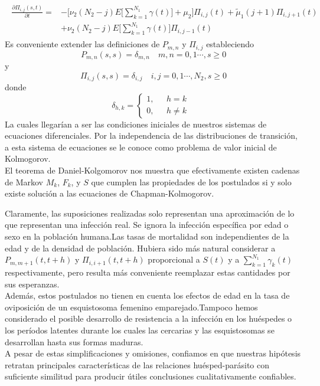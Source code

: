 \begin{eqnarray}
    \begin{array}{cr}
     \frac{\partial\Pi_{i,j}(s,t)}{\partial t}= & -\bigg[\nu_2(N_2-j)E\big[\sum_{k=1}^{N_1}\gamma(t)\big]+\mu_2\bigg]\Pi_{i,j}(t)
     +\tilde{\mu}_1 (j+1)\Pi_{i,j+1}(t)
     \\&+\nu_2(N_2-j)E\big[\sum_{k=1}^{N_1}\gamma(t)\big]\Pi_{i,j-1}(t)
    \end{array}
\end{eqnarray}Es conveniente extender las definiciones de $P_{m,n}$ y $\Pi_{i,j}$ estableciendo $$P_{m,n}(s,s)=\delta_{m,n}\quad m,n=0,1\cdots, s\geq 0$$
y
$$\Pi_{i,j}(s,s)=\delta_{i,j}\quad i,j=0,1\cdots,N_2, s\geq 0$$
donde 
$$\delta_{h,k}=
    \begin{cases}
    1, & \mbox{ $h=k$ } \\
    0, & \mbox{ $h\not=k$}
    \end{cases}$$
La cuales llegarían a ser las condiciones iniciales de nuestros sistemas de ecuaciones diferenciales.
Por la independencia de las distribuciones de transición, a esta sistema de ecuaciones se le conoce como problema de valor inicial de Kolmogorov.\\ El teorema de Daniel-Kolgomorov nos muestra que efectivamente existen cadenas de Markov $M_k$, $F_k$, y $S$ que cumplen las propiedades de los postulados si y solo existe solución a las ecuaciones de Chapman-Kolmogorov.
\begin{Obs}
    Claramente, las suposiciones realizadas solo representan una aproximación de lo que representan una infección real. Se ignora la infección específica por edad o sexo en la población humana.Las tasas de mortalidad son independientes de la edad y de la densidad de población. Hubiera sido más natural considerar a $P_{m,m+1}(t,t+h)$ y $\Pi_{i,i+1}(t,t+h)$ proporcional a $S(t)$ y a $\sum_{k=1}^{N_1}\gamma_k(t)$ respectivamente, pero resulta más conveniente reemplazar estas cantidades por sus esperanzas.\\
    Además, estos postulados no tienen en cuenta los efectos de edad en la tasa de oviposición de un esquistosoma femenino emparejado.Tampoco hemos considerado el posible desarrollo de resistencia a la infección en los huéspedes o los períodos latentes durante los cuales las cercarias y las esquistosomas se desarrollan hasta sus formas maduras.\\A pesar de estas simplificaciones y omisiones, confiamos en que nuestras hipótesis retratan principales
    características de las relaciones huésped-parásito con suficiente similitud para producir útiles conclusiones cualitativamente confiables.
\end{Obs}
